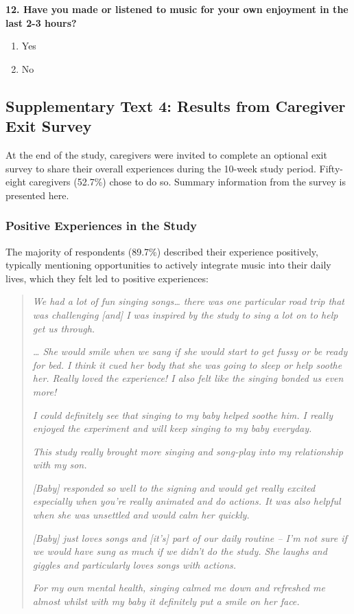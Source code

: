 \documentclass[
]{article}
\providecommand{\tightlist}{%
  \setlength{\itemsep}{0pt}\setlength{\parskip}{0pt}}
\begin{document}
\textbf{12. Have you made or listened to music for your own enjoyment in
the last 2-3 hours?}

\begin{enumerate}
\def\labelenumi{\alph{enumi}.}
\tightlist
\item
  Yes
\item
  No
\end{enumerate}

\subsection*{Supplementary Text 4: Results from Caregiver Exit
Survey}\label{supplementary-text-4-results-from-caregiver-exit-survey}

At the end of the study, caregivers were invited to complete an optional
exit survey to share their overall experiences during the 10-week study
period. Fifty-eight caregivers (52.7\%) chose to do so. Summary
information from the survey is presented here.

\subsubsection*{Positive Experiences in the
Study}\label{positive-experiences-in-the-study}

The majority of respondents (89.7\%) described their experience
positively, typically mentioning opportunities to actively integrate
music into their daily lives, which they felt led to positive
experiences:

\begin{quote}
\textit{We had a lot of fun singing songs… there was one particular road trip that was challenging [and] I was inspired by the study to sing a lot on to help get us through.}
  
\textit{… She would smile when we sang if she would start to get fussy or be ready for bed. I think it cued her body that she was going to sleep or help soothe her. Really loved the experience! I also felt like the singing bonded us even more!}
  
\textit{I could definitely see that singing to my baby helped soothe him. I really enjoyed the experiment and will keep singing to my baby everyday.}
  
\textit{This study really brought more singing and song-play into my relationship with my son.}
  
\textit{[Baby] responded so well to the signing and would get really excited especially when you're really animated and do actions. It was also helpful when she was unsettled and would calm her quickly.}
  
\textit{[Baby] just loves songs and [it’s] part of our daily routine – I’m not sure if we would have sung as much if we didn’t do the study. She laughs and giggles and particularly loves songs with actions.}
  
\textit{For my own mental health, singing calmed me down and refreshed me almost whilst with my baby it definitely put a smile on her face.}
\end{quote}
\end{document}

